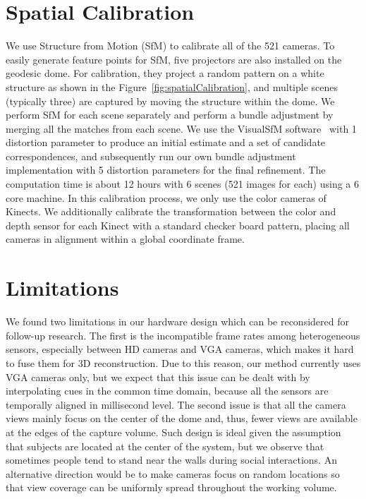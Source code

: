 \section{Spatial Calibration}
We use Structure from Motion (SfM) to calibrate all of the 521 cameras. To easily generate feature points for SfM, five projectors are also installed on the geodesic dome. For calibration, they project a random pattern on a white structure as shown in the Figure~\ref{fig:spatialCalibration}, and multiple scenes (typically three) are captured by moving the structure within the dome. We perform SfM for each scene separately and perform a bundle adjustment by merging all the matches from each scene. We use the VisualSfM software~\cite{vsfm} with 1 distortion parameter to produce an initial estimate and a set of candidate correspondences, and subsequently run our own bundle adjustment implementation with 5 distortion parameters for the final refinement. The computation time is about 12 hours with 6 scenes (521 images for each) using a 6 core machine. 
In this calibration process, we only use the color cameras of Kinects. We additionally calibrate the transformation between the color and depth sensor for each Kinect with a standard checker board pattern, placing all cameras in alignment within a global coordinate frame.

\section{Limitations}
We found two limitations in our hardware design which can be reconsidered for follow-up research. The first is the incompatible frame rates among heterogeneous sensors, especially between HD cameras and VGA cameras, which makes it hard to fuse them for 3D reconstruction. Due to this reason, our method currently uses VGA cameras only, but we expect that this issue can be dealt with by interpolating cues in  the common time domain, because all the sensors are temporally aligned in millisecond level. The second issue is that all the camera views mainly focus on the center of the dome and, thus, fewer views are available at the edges of the capture volume. Such design is ideal given the assumption that subjects are located at the center of the system, but we observe that sometimes people tend to stand near the walls during social interactions. An alternative direction would be to make cameras focus on random locations so that view coverage can be uniformly spread throughout the working volume. 



